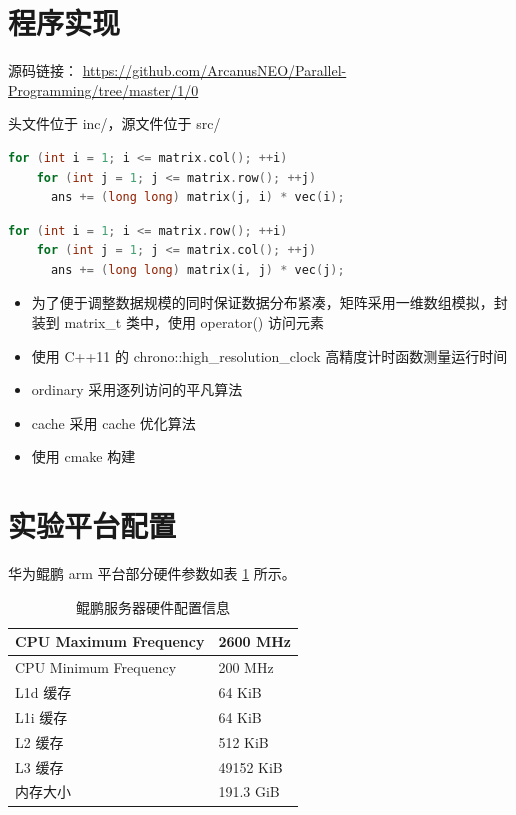 \documentclass[a4paper]{article}
\begin{document}
\section{程序实现}
源码链接：
\url{https://github.com/ArcanusNEO/Parallel-Programming/tree/master/1/0}

头文件位于 inc/，源文件位于 src/

\begin{lstlisting}[title=逐列访问平凡算法,frame=trbl,language={C++}]
  for (int i = 1; i <= matrix.col(); ++i)
    for (int j = 1; j <= matrix.row(); ++j)
      ans += (long long) matrix(j, i) * vec(i);
\end{lstlisting}

\begin{lstlisting}[title=cache 优化算法,frame=trbl,language={C++}]
  for (int i = 1; i <= matrix.row(); ++i)
    for (int j = 1; j <= matrix.col(); ++j)
      ans += (long long) matrix(i, j) * vec(j);
\end{lstlisting}

\begin{itemize}
  \item 为了便于调整数据规模的同时保证数据分布紧凑，矩阵采用一维数组模拟，封装到 matrix_t 类中，使用 operator() 访问元素
  \item 使用 C++11 的 chrono::high_resolution_clock 高精度计时函数测量运行时间
  \item ordinary 采用逐列访问的平凡算法
  \item cache 采用 cache 优化算法
  \item 使用 cmake 构建
\end{itemize}

\section{实验平台配置}
华为鲲鹏 arm 平台部分硬件参数如表 \ref{tab:arm-arch} 所示。
\begin{table}[]
  \centering
  \begin{tabular}{ll}
    \hline
    CPU Maximum Frequency & 2600 MHz  \\   \hline
    CPU Minimum Frequency & 200 MHz   \\   \hline
    L1d 缓存              & 64 KiB    \\   \hline
    L1i 缓存              & 64 KiB    \\   \hline
    L2 缓存               & 512 KiB   \\   \hline
    L3 缓存               & 49152 KiB \\   \hline
    内存大小              & 191.3 GiB \\   \hline
  \end{tabular}
  \caption{鲲鹏服务器硬件配置信息}
  \label{tab:arm-arch}
\end{table}
\end{document}
